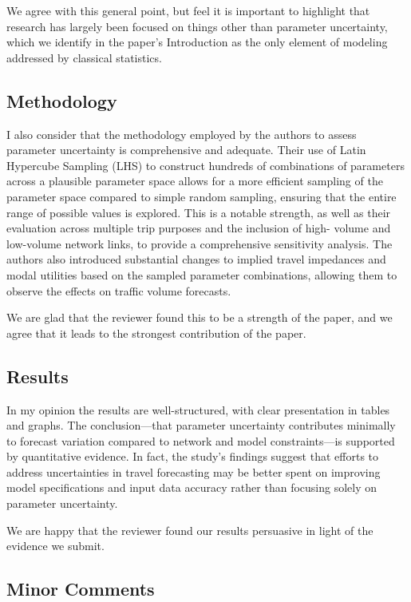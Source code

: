 \documentclass{ar2rc}
\begin{document}
\AR We agree with this general point, but feel it is important to highlight that research 
has largely been focused on things other than parameter uncertainty, which we identify in 
the paper's Introduction as the only element of modeling addressed by classical statistics.


\subsection{Methodology}
\RC I also consider that the methodology employed by the authors to assess parameter
uncertainty is comprehensive and adequate. Their use of Latin Hypercube Sampling (LHS)
to construct hundreds of combinations of parameters across a plausible parameter space
allows for a more efficient sampling of the parameter space compared to simple random
sampling, ensuring that the entire range of possible values is explored. This is a notable
strength, as well as their evaluation across multiple trip purposes and the inclusion of high-
volume and low-volume network links, to provide a comprehensive sensitivity analysis. The
authors also introduced substantial changes to implied travel impedances and modal
utilities based on the sampled parameter combinations, allowing them to observe the
effects on traffic volume forecasts.

\AR We are glad that the reviewer found this to be a strength of the paper, and we agree that 
it leads to the strongest contribution of the paper.


\subsection{Results}
\RC In my opinion the results are well-structured, with clear presentation in tables and graphs.
The conclusion—that parameter uncertainty contributes minimally to forecast variation
compared to network and model constraints—is supported by quantitative evidence. In
fact, the study's findings suggest that efforts to address uncertainties in travel forecasting
may be better spent on improving model specifications and input data accuracy rather than
focusing solely on parameter uncertainty.

\AR We are happy that the reviewer found our results persuasive in light of the evidence we submit.

\subsection{Minor Comments}
\end{document}
